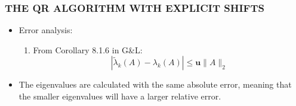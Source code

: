 \documentclass[a4paper,8pt]{beamer} %
\newcommand{\ts}[1]{\textbf{#1}}
\newcommand{\norm}[1]{\lVert{#1}\rVert}
\begin{document}
\begin{frame}  %
\frametitle{THE QR ALGORITHM WITH EXPLICIT SHIFTS}
\begin{itemize}
	\item <1-> Error analysis:
		\begin{enumerate}
			\item From Corollary 8.1.6 in G\&L: %
				\begin{equation}
					|\tilde \lambda_k(A)-\lambda_k(A)| \le \ts u\norm{A}_2 
				\end{equation}
		\end{enumerate}
	\item <2-> The eigenvalues are calculated with the same absolute error, meaning that the 
			smaller eigenvalues will have a larger relative error.
\end{itemize}
\end{frame} %
\end{document}
